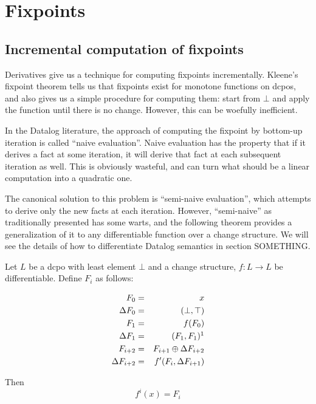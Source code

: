 \section{Fixpoints}

\subsection{Incremental computation of fixpoints}

Derivatives give us a technique for computing fixpoints incrementally. Kleene's
fixpoint theorem tells us that fixpoints exist for monotone functions on dcpos, and also gives us
a simple procedure for computing them: start from $\bot$ and apply the function
until there is no change. However, this can be woefully inefficient.

In the Datalog literature, the approach of computing the fixpoint by bottom-up
iteration is called ``naive evaluation''. Naive evaluation has the property that
if it derives a fact at some iteration, it will derive that fact at each
subsequent iteration as well. This is obviously wasteful, and can turn what
should be a linear computation into a quadratic one.

The canonical solution to this problem is ``semi-naive evaluation'', which
attempts to derive only the new facts at each iteration. However, ``semi-naive''
as traditionally presented has some warts, and
the following theorem provides a generalization of it to any differentiable function over a
change structure. We will see the details of how to differentiate Datalog
semantics in section SOMETHING.

\begin{thm}
\label{thm:diffIter}
  Let $L$ be a dcpo with least element $\bot$ and a change structure, $f: L \rightarrow L$ be
  differentiable. Define $F_i$ as follows:

  \begin{eqnarray*}
  F_0 & = & x\\
  \Delta F_0 & = & (\bot, \top) \\
  F_1 & = & f(F_0)\\
  \Delta F_1 & = & (F_1, F_1) \footnotemark \\
  F_{i+2} & = & F_{i+1} \cplus \Delta F_{i+2} \\
  \Delta F_{i+2} & = & \derive{f}(F_i, \Delta F_{i+1}) \\
  \end{eqnarray*}

  Then 
  $$f^i(x) = F_i$$
\end{thm}

